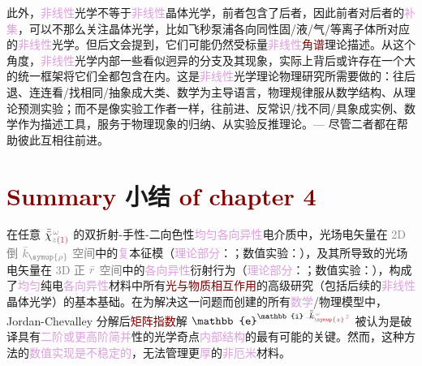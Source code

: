 此外，\textcolor{Plum}{非线性}\textcolor{NavyBlue}{光学}不等于\textcolor{Plum}{非线性}\textcolor{PineGreen}{晶体光学}，前者包含了后者，因此前者对后者的\textcolor{Plum}{补集}，可以不那么关注\textcolor{PineGreen}{晶体光学}，比如\textcolor{NavyBlue}{飞秒泵浦}各向同性\textcolor{NavyBlue}{固}/\textcolor{NavyBlue}{液}/\textcolor{NavyBlue}{气}/\textcolor{NavyBlue}{等离子体}所对应的\textcolor{Plum}{非线性}\textcolor{NavyBlue}{光学}。但后文会提到，它们可能仍然受标量\textcolor{Plum}{非线性}\textcolor{Maroon}{角谱}理论描述。从这个角度，\textcolor{Plum}{非线性}\textcolor{NavyBlue}{光学}内部一些看似迥异的分支及其现象，实际上背后或许存在一个大的统一框架将它们全都包含在内。这是\textcolor{Plum}{非线性}\textcolor{NavyBlue}{光学}\textcolor{NavyBlue}{理论物理}研究所需要做的：往后退、连连看/找相同/抽象成大类、数学为主导语言，物理规律服从数学结构、从理论预测实验；而不是像实验工作者一样，往前进、反常识/找不同/具象成实例、数学作为描述工具，服务于物理现象的归纳、从实验反推理论。--- 尽管二者都在帮助彼此互相往前进。

\vspace*{-1.5em}

\section{\textcolor{Maroon}{Summary} 小结 \textcolor{Maroon}{of chapter 4}}\label{sec:summary-chapter4}

在任意 $\bar{\bar{\chi}}^{\;\! \mathcolor{gray}{\omega}}_{\mathcolor{gray}{z} \textcolor{Maroon}{(1)}}$ 的\textcolor{NavyBlue}{双折射}-\textcolor{NavyBlue}{手性}-\textcolor{NavyBlue}{二向色性}\textcolor{Plum}{均匀}\textcolor{Plum}{各向异性}电介质中，\textcolor{PineGreen}{光场电矢量}在 \textcolor{gray}{2D 倒} $\mathcolor{gray}{\bar{k}_{\symup{\rho}}}$ \textcolor{gray}{空间}中的\textcolor{Plum}{复}\textcolor{PineGreen}{本征模}（\textcolor{Plum}{理论部分}：；\textcolor{NavyBlue}{数值实验}：），及其所导致的\textcolor{PineGreen}{光场电矢量}在 \textcolor{gray}{3D 正} $\mathcolor{gray}{\bar{r}}$ \textcolor{gray}{空间}中的\textcolor{Plum}{各向异性}衍射行为（\textcolor{Plum}{理论部分}：；\textcolor{NavyBlue}{数值实验}：），构成了\textcolor{Plum}{均匀}纯电\textcolor{Plum}{各向异性}材料中所有\textcolor{Maroon}{光与物质相互作用}的高级研究（包括后续的\textcolor{Plum}{非线性}\textcolor{PineGreen}{晶体光学}）的基本基础。在为解决这一问题而创建的所有\textcolor{Plum}{数学}/\textcolor{NavyBlue}{物理模型}中，\textcolor{PineGreen}{Jordan-Chevalley 分解}后\textcolor{Maroon}{矩阵指数}解 $\mathbb{e}^{\mathbb{i} \Xint{\begin{smallmatrix} ~ \\ {}^{}_{\mathcolor{gray}{-}} \\ ~ \end{smallmatrix}}{15}{\bar{\bar{k}}}_{\textcolor{Maroon}{\symup{z}}}^{\;\! \mathcolor{gray}{\omega}} \mathcolor{gray}{z}}$ 被认为是破译具有\textcolor{Plum}{二阶或更高阶简并}性的\textcolor{PineGreen}{光学奇点}\textcolor{Plum}{内部结构}的最有可能的关键。然而，这种方法的\textcolor{Plum}{数值实现是不稳定的}，无法管理更\textcolor{Plum}{厚}的\textcolor{Plum}{非厄米}材料。


